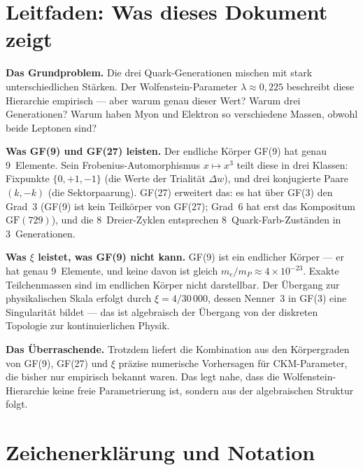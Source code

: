 \section*{Leitfaden: Was dieses Dokument zeigt}

\textbf{Das Grundproblem.}
Die drei Quark-Generationen mischen mit stark unterschiedlichen Stärken.
Der Wolfenstein-Parameter $\lambda\approx 0{,}225$ beschreibt diese Hierarchie
empirisch — aber warum genau dieser Wert? Warum drei Generationen?
Warum haben Myon und Elektron so verschiedene Massen, obwohl beide
Leptonen sind?

\textbf{Was GF(9) und GF(27) leisten.}
Der endliche Körper GF(9) hat genau 9~Elemente. Sein Frobenius-Automorphismus
$x\mapsto x^3$ teilt diese in drei Klassen: Fixpunkte $\{0,+1,-1\}$ (die
Werte der Trialität $\Delta w$), und drei konjugierte Paare $(k,-k)$ (die Sektorpaarung).
GF(27) erweitert das: es hat über GF(3) den Grad~3 (GF(9) ist kein Teilkörper
von GF(27); Grad~6 hat erst das Kompositum $\mathrm{GF}(729)$),
und die 8~Dreier-Zyklen entsprechen 8~Quark-Farb-Zuständen in
3~Generationen.

\textbf{Was $\xi$ leistet, was GF(9) nicht kann.}
GF(9) ist ein endlicher Körper — er hat genau 9~Elemente,
und keine davon ist gleich $m_e/m_P \approx 4\times 10^{-23}$.
Exakte Teilchenmassen sind im endlichen Körper nicht darstellbar.
Der Übergang zur physikalischen Skala erfolgt durch $\xi = 4/30\,000$,
dessen Nenner~3 in GF(3) eine Singularität bildet — das ist algebraisch
der Übergang von der diskreten Topologie zur kontinuierlichen Physik.

\textbf{Das Überraschende.}
Trotzdem liefert die Kombination aus den Körpergraden von GF(9), GF(27) und $\xi$ präzise
numerische Vorhersagen für CKM-Parameter, die bisher nur empirisch bekannt
waren. Das legt nahe, dass die Wolfenstein-Hierarchie keine freie Parametrierung
ist, sondern aus der algebraischen Struktur folgt.

\section*{Zeichenerklärung und Notation}

